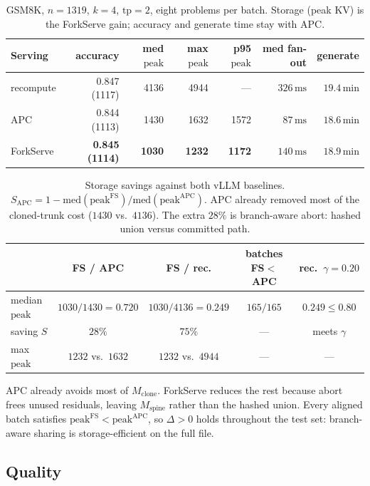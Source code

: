 \documentclass[11pt,a4paper]{article}
\begin{document}
\begin{table}[h]
\centering
\small
\begin{tabular}{@{}lrrrrrr@{}}
\toprule
Serving & accuracy & med $\mathrm{peak}$ & max $\mathrm{peak}$ & p95 $\mathrm{peak}$ & med fan-out & generate \\
\midrule
recompute & 0.847 (1117) & 4136 & 4944 & --- & $326\,\mathrm{ms}$ & $19.4\,\mathrm{min}$ \\
APC       & 0.844 (1113) & 1430 & 1632 & 1572 & $87\,\mathrm{ms}$  & $18.6\,\mathrm{min}$ \\
ForkServe & \textbf{0.845 (1114)} & \textbf{1030} & \textbf{1232} & \textbf{1172} & $140\,\mathrm{ms}$ & $18.9\,\mathrm{min}$ \\
\bottomrule
\end{tabular}
\caption{GSM8K, $n{=}1319$, $k{=}4$, $\mathrm{tp}{=}2$, eight problems per batch.
Storage (peak KV) is the ForkServe gain; accuracy and generate time stay with APC.}
\end{table}

\begin{table}[h]
\centering
\small
\begin{tabular}{@{}lcccc@{}}
\toprule
 & FS / APC & FS / rec. & batches FS${<}$APC & rec.\ $\gamma{=}0.20$ \\
\midrule
median $\mathrm{peak}$ & $1030/1430{=}0.720$ & $1030/4136{=}0.249$ & $165/165$ & $0.249\le 0.80$ \\
saving $S$ & $28\%$ & $75\%$ & --- & meets $\gamma$ \\
max $\mathrm{peak}$ & $1232$ vs.\ $1632$ & $1232$ vs.\ $4944$ & --- & --- \\
\bottomrule
\end{tabular}
\caption{Storage savings against both vLLM baselines.
$S_{\mathrm{APC}}{=}1-\mathrm{med}(\mathrm{peak}^{\mathrm{FS}})/\mathrm{med}(\mathrm{peak}^{\mathrm{APC}})$.
APC already removed most of the cloned-trunk cost ($1430$ vs.\ $4136$).
The extra $28\%$ is branch-aware abort: hashed union versus committed path.}
\end{table}

APC already avoids most of $M_{\mathrm{clone}}$.
ForkServe reduces the rest because abort frees unused residuals, leaving $M_{\mathrm{spine}}$ rather than the hashed union.
Every aligned batch satisfies $\mathrm{peak}^{\mathrm{FS}}<\mathrm{peak}^{\mathrm{APC}}$, so $\Delta>0$ holds throughout the test set: branch-aware sharing is storage-efficient on the full file.

\subsection{Quality}
\end{document}
